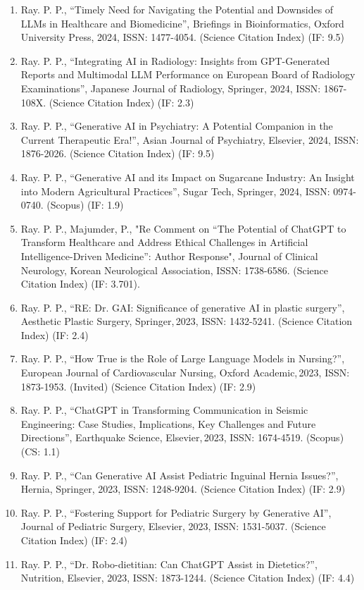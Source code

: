 \documentclass[11pt,a4paper]{moderncv}
\begin{document}
\begin{adjustwidth}{6em}{0pt}
\begin{enumerate}
		\item Ray. P. P., “Timely Need for Navigating the Potential and Downsides of LLMs in Healthcare and Biomedicine”, Briefings in Bioinformatics, Oxford University Press, 2024, ISSN: 1477-4054. (Science Citation Index) (IF: 9.5)
		\item Ray. P. P., “Integrating AI in Radiology: Insights from GPT-Generated Reports and Multimodal LLM Performance on European Board of Radiology Examinations”, Japanese Journal of Radiology, Springer, 2024, ISSN: 1867-108X. (Science Citation Index) (IF: 2.3)
		\item Ray. P. P., “Generative AI in Psychiatry: A Potential Companion in the Current Therapeutic Era!”, Asian Journal of Psychiatry, Elsevier, 2024, ISSN: 1876-2026. (Science Citation Index) (IF: 9.5)
		\item Ray. P. P., “Generative AI and its Impact on Sugarcane Industry: An Insight into Modern Agricultural Practices”, Sugar Tech, Springer, 2024, ISSN: 0974-0740. (Scopus) (IF: 1.9)
		\item Ray. P. P., Majumder, P., "Re Comment on “The Potential of ChatGPT to Transform Healthcare and Address Ethical Challenges in Artificial Intelligence-Driven Medicine”: Author Response", Journal of Clinical Neurology, Korean Neurological Association, ISSN: 1738-6586. (Science Citation Index) (IF: 3.701).
		\item Ray. P. P., “RE: Dr. GAI: Significance of generative AI in plastic surgery”, Aesthetic Plastic Surgery, Springer, 2023, ISSN: 1432-5241. (Science Citation Index) (IF: 2.4)
		\item Ray. P. P., “How True is the Role of Large Language Models in Nursing?”, European Journal of Cardiovascular Nursing, Oxford Academic, 2023, ISSN: 1873-1953. (Invited) (Science Citation Index) (IF: 2.9)
		\item Ray. P. P., “ChatGPT in Transforming Communication in Seismic Engineering: Case Studies, Implications, Key Challenges and Future Directions”, Earthquake Science, Elsevier, 2023, ISSN: 1674-4519. (Scopus) (CS: 1.1)
		\item Ray. P. P., “Can Generative AI Assist Pediatric Inguinal Hernia Issues?”, Hernia, Springer, 2023, ISSN: 1248-9204. (Science Citation Index) (IF: 2.9)
		\item Ray. P. P., “Fostering Support for Pediatric Surgery by Generative AI”, Journal of Pediatric Surgery, Elsevier, 2023, ISSN: 1531-5037. (Science Citation Index) (IF: 2.4)
		\item Ray. P. P., “Dr. Robo-dietitian: Can ChatGPT Assist in Dietetics?”, Nutrition, Elsevier, 2023, ISSN: 1873-1244. (Science Citation Index) (IF: 4.4)

\end{enumerate}
\end{adjustwidth}
\end{document}
